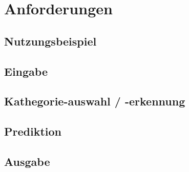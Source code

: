 \section{Anforderungen}

\subsection{Nutzungsbeispiel}
\subsection{Eingabe}
\subsection{Kathegorie-auswahl / -erkennung}
\subsection{Prediktion}
\subsection{Ausgabe}